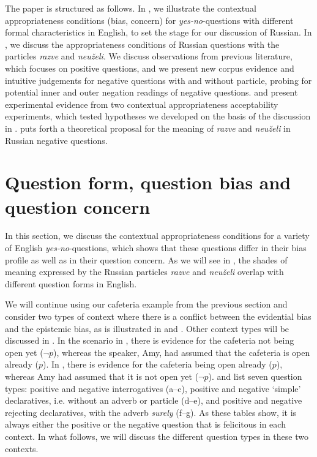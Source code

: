 \documentclass[output=paper,colorlinks,citecolor=brown]{langscibook}
\begin{document}
The paper is structured as follows. In , we illustrate the contextual appropriateness conditions (bias, concern) for \textit{yes-no}-questions with different formal characteristics in English, to set the stage for our discussion of Russian. In , we discuss the appropriateness conditions of Russian questions with the particles \textit{razve} and \textit{neuželi}. We discuss observations from previous literature, which focuses on positive questions, and we present new corpus evidence and intuitive judgements for negative questions with and without particle, probing for potential inner and outer negation readings of negative questions.  and  present experimental evidence from two contextual appropriateness acceptability experiments, which tested hypotheses we developed on the basis of the discussion in .  puts forth a theoretical proposal for the meaning of \textit{razve} and \textit{neuželi} in Russian negative questions.

\section{Question form, question bias and question concern} \label{sec:05:2}
In this section, we discuss the contextual appropriateness conditions for a variety of English \textit{yes-no}-questions, which shows that these questions differ in their bias profile as well as in their question concern. As we will see in , the shades of meaning expressed by the Russian particles \textit{razve} and \textit{neuželi} overlap with different question forms in English.

We will continue using our cafeteria example from the previous section and consider two types of context where there is a conflict between the evidential bias and the epistemic bias, as is illustrated in  and . Other context types will be discussed in . In the scenario in , there is evidence for the cafeteria not being open yet ($\neg p$), whereas the speaker, Amy, had assumed that the cafeteria is open already ($p$). In , there is evidence for the cafeteria being open already ($p$), whereas Amy had assumed that it is not open yet ($\neg p$).  and  list seven question types: positive and negative interrogatives (a--c), positive and negative `simple' declaratives, i.e. without an adverb or particle (d--e), and positive and negative rejecting declaratives, with the adverb \textit{surely} (f--g). As these tables show, it is always either the positive or the negative question that is felicitous in each context. In what follows, we will discuss the different question types in these two contexts.
\end{document}
